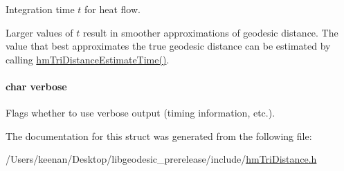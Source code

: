 Integration time $t$ for heat flow. 

Larger values of $t$ result in smoother approximations of geodesic distance. The value that best approximates the true geodesic distance can be estimated by calling \hyperlink{structhm_tri_distance_ab8619d4051e27e72dc8c58b8863bde07}{hm\-Tri\-Distance\-Estimate\-Time()}. \hypertarget{structhm_tri_distance_a55cc7b4c411cfefc0601bba6b089cb71}{
\paragraph[{verbose}]{\setlength{\rightskip}{0pt plus 5cm}char verbose}}\label{structhm_tri_distance_a55cc7b4c411cfefc0601bba6b089cb71}


Flags whether to use verbose output (timing information, etc.). 



The documentation for this struct was generated from the following file\-:\begin{DoxyCompactItemize}
\item 
/\-Users/keenan/\-Desktop/libgeodesic\-\_\-prerelease/include/\hyperlink{hm_tri_distance_8h}{hm\-Tri\-Distance.\-h}\end{DoxyCompactItemize}
